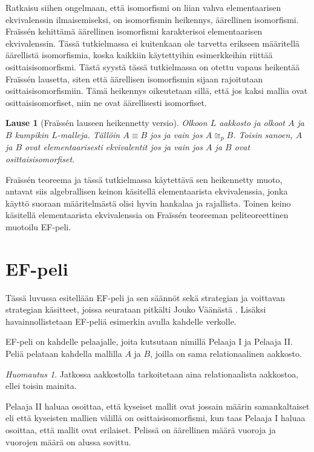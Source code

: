 \documentclass[finnish]{tktltiki2}
\newtheorem{lau}{Lause}
\theoremstyle{definition}
\theoremstyle{remark}
\newtheorem*{huom}{Huomautus}
\begin{document}
Ratkaisu siihen ongelmaan, että isomorfismi on liian vahva elementaarisen ekvivalenssin ilmaisemiseksi, on isomorfismin heikennys, äärellinen isomorfismi. Fraïssén kehittämä äärellinen isomorfismi karakterisoi elementaarisen ekvivalenssin. Tässä tutkielmassa ei kuitenkaan ole tarvetta erikseen määritellä äärellistä isomorfismia, koska kaikkiin käytettyihin esimerkkeihin riittää osittaisisomorfismi. Tästä syystä tässä tutkielmassa on otettu vapaus heikentää Fraïssén lausetta, siten että äärellisen isomorfismin sijaan rajoitutaan osittaisisomorfismiin. Tämä heikennys oikeutetaan sillä, että jos kaksi mallia ovat osittaisisomorfiset, niin ne ovat äärellisesti isomorfiset.

\begin{lau}[Fraïssén lauseen heikennetty versio]
Olkoon $L$ aakkosto ja olkoot $A$ ja $B$ kumpikin $L$-malleja. Tällöin $A \equiv B$ jos ja vain jos $A \cong_p B$. Toisin sanoen, $A$ ja $B$ ovat elementaarisesti ekvivalentit jos ja vain jos $A$ ja $B$ ovat osittaisisomorfiset.
\end{lau}

Fraïssén teoreema ja tässä tutkielmassa käytettävä sen heikennetty muoto, antavat siis algebrallisen keinon käsitellä elementaarista ekvivalenssia, jonka käyttö suoraan määritelmästä olisi hyvin hankalaa ja rajallista. Toinen keino käsitellä elementaarista ekvivalenssia on Fraïssén teoreeman peliteoreettinen muotoilu EF-peli.

\section{EF-peli}
Tässä luvussa esitellään EF-peli ja sen säännöt sekä strategian ja voittavan strategian käsitteet, joissa seurataan pitkälti Jouko Väänästä \cite{Vaa11}. Lisäksi havainnollistetaan EF-peliä esimerkin avulla kahdelle verkolle.

EF-peli on kahdelle pelaajalle, joita kutsutaan nimillä Pelaaja I ja Pelaaja II. Peliä pelataan kahdella mallilla $A$ ja $B$, joilla on sama relationaalinen aakkosto. \begin{huom}
Jatkossa aakkostolla tarkoitetaan aina relationaalista aakkostoa, ellei toisin mainita.
\end{huom} Pelaaja II haluaa osoittaa, että kyseiset mallit ovat jossain määrin samankaltaiset eli että kyseisten mallien välillä on osittaisisomorfismi, kun taas Pelaaja I haluaa osoittaa, että mallit ovat erilaiset. Pelissä on äärellinen määrä vuoroja ja vuorojen määrä on alussa sovittu.
\end{document}
